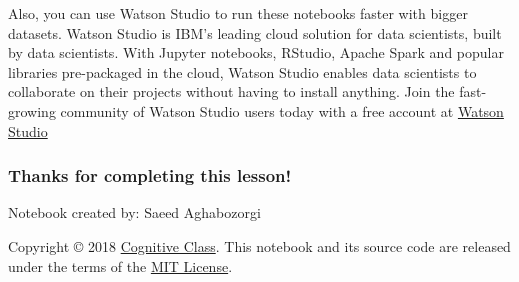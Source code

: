 \documentclass[11pt]{article}
\begin{document}
Also, you can use Watson Studio to run these notebooks faster with
bigger datasets. Watson Studio is IBM's leading cloud solution for data
scientists, built by data scientists. With Jupyter notebooks, RStudio,
Apache Spark and popular libraries pre-packaged in the cloud, Watson
Studio enables data scientists to collaborate on their projects without
having to install anything. Join the fast-growing community of Watson
Studio users today with a free account at
\href{https://cocl.us/ML0101EN_DSX}{Watson Studio}

\subsubsection{Thanks for completing this
lesson!}\label{thanks-for-completing-this-lesson}

Notebook created by: Saeed Aghabozorgi

Copyright © 2018 \href{https://cocl.us/DX0108EN_CC}{Cognitive Class}.
This notebook and its source code are released under the terms of the
\href{https://bigdatauniversity.com/mit-license/}{MIT License}.​


    
    
    
    
\end{document}
